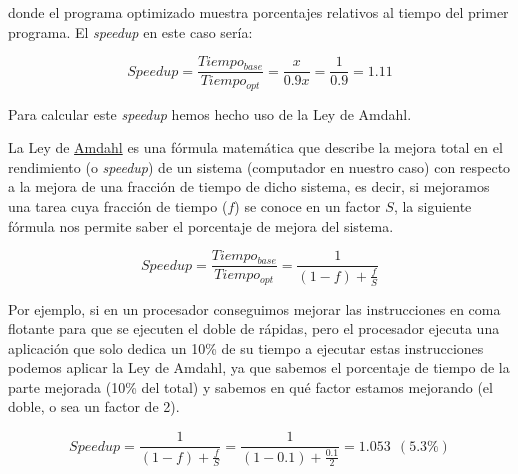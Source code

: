 \documentclass[12pt,onecolumn]{memoir}
\begin{document}
\begin{center}
\end{center}

donde el programa optimizado muestra porcentajes relativos al tiempo
del primer programa. El \emph{speedup} en este caso sería:

\[ Speedup = \frac{Tiempo_{base}}{Tiempo_{opt}} = \frac{x}{0.9x} = \frac{1}{0.9} = 1.11 \]

Para calcular este \emph{speedup} hemos hecho uso de la Ley de Amdahl.

La Ley de \href{https://es.wikipedia.org/wiki/Gene_Amdahl}{Amdahl} es una 
fórmula matemática que describe la mejora total en el rendimiento (o \emph{speedup}) de un 
sistema (computador en nuestro caso) con respecto a la mejora de una
fracción de tiempo
de dicho sistema, es decir, si mejoramos una tarea cuya fracción de
tiempo ($f$) se conoce en un factor $S$, la siguiente fórmula nos permite saber el porcentaje de
mejora del sistema.

\[ Speedup = \frac{Tiempo_{base}}{Tiempo_{opt}} = \frac{1}{(1 - f) + \frac{f}{S}} \]

Por ejemplo, si en un procesador conseguimos mejorar las instrucciones en coma flotante para
que se ejecuten el doble de rápidas,
pero el procesador ejecuta una aplicación que solo dedica un 10\% de su tiempo a ejecutar estas
instrucciones podemos aplicar la Ley de Amdahl, ya que sabemos el
porcentaje de tiempo de la parte mejorada (10\% del total) y sabemos
en qué factor estamos mejorando (el doble, o sea un factor de 2).

\[ Speedup = \frac{1}{(1 - f) + \frac{f}{S}} = \frac{1}{(1 - 0.1) +
  \frac{0.1}{2}} = 1.053 ~ ~ (5.3\%) \]
\end{document}

